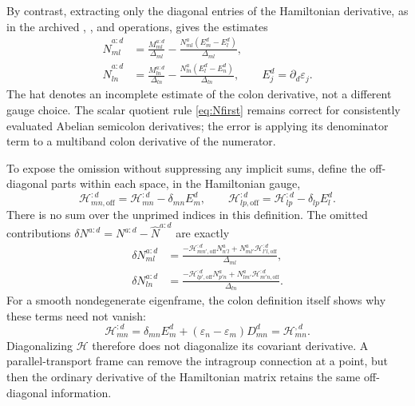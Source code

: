 \documentclass[prx,amsmath,amssymb,superscriptaddress,longbibliography]{revtex4-2}
\newcommand{\code}[1]{\texttt{\detokenize{#1}}}
\begin{document}
By contrast, extracting only the diagonal entries of the Hamiltonian
derivative, as in the archived \code{Vn}, \code{Vl}, and \code{deltaV}
operations, gives the estimates
\begin{align}
 \widehat N_{ml}^{a:d}
 &=\frac{M_{ml}^{a:d}}{\Delta_{ml}}
   -\frac{N_{ml}^a(E_m^d-E_l^d)}{\Delta_{ml}},\nonumber\\
 \widehat N_{ln}^{a:d}
 &=\frac{M_{ln}^{a:d}}{\Delta_{ln}}
   -\frac{N_{ln}^a(E_l^d-E_n^d)}{\Delta_{ln}},
 \qquad E_j^d=\partial_d\varepsilon_j.
 \label{eq:Nfirst-diagonal-estimate}
\end{align}
The hat denotes an incomplete estimate of the colon derivative, not a
different gauge choice. The scalar quotient rule
\eqref{eq:Nfirst} remains correct for consistently evaluated Abelian
semicolon derivatives; the error is applying its denominator term to a
multiband colon derivative of the numerator.

To expose the omission without suppressing any implicit sums, define the
off-diagonal parts within each space, in the Hamiltonian gauge,
\begin{equation}
 \mathcal H_{mn,\mathrm{off}}^{:d}
 =\mathcal H_{mn}^{:d}-\delta_{mn}E_m^d,\qquad
 \mathcal H_{lp,\mathrm{off}}^{:d}
 =\mathcal H_{lp}^{:d}-\delta_{lp}E_l^d.
 \label{eq:intraspace-Hder-off}
\end{equation}
There is no sum over the unprimed indices in this definition. The omitted
contributions $\delta N^{a:d}=N^{a:d}-\widehat N^{a:d}$ are exactly
\begin{align}
 \delta N_{ml}^{a:d}
 &=\frac{-\mathcal H_{mn',\mathrm{off}}^{:d}N_{n'l}^a
          +N_{ml'}^a\mathcal H_{l'l,\mathrm{off}}^{:d}}{\Delta_{ml}},\nonumber\\
 \delta N_{ln}^{a:d}
 &=\frac{-\mathcal H_{lp',\mathrm{off}}^{:d}N_{p'n}^a
          +N_{lm'}^a\mathcal H_{m'n,\mathrm{off}}^{:d}}{\Delta_{ln}}.
 \label{eq:Nfirst-missing-components}
\end{align}
For a smooth nondegenerate eigenframe, the colon definition itself shows
why these terms need not vanish:
\begin{equation}
 \mathcal H_{mn}^{:d}
 =\delta_{mn}E_m^d+(\varepsilon_n-\varepsilon_m)D_{mn}^d
 =\mathcal H_{mn}^{,d}.
 \label{eq:Hdiag-not-Hderdiag}
\end{equation}
Diagonalizing $\mathcal H$ therefore does not diagonalize its covariant
derivative. A parallel-transport frame can remove the intragroup connection
at a point, but then the ordinary derivative of the Hamiltonian matrix
retains the same off-diagonal information.
\end{document}
